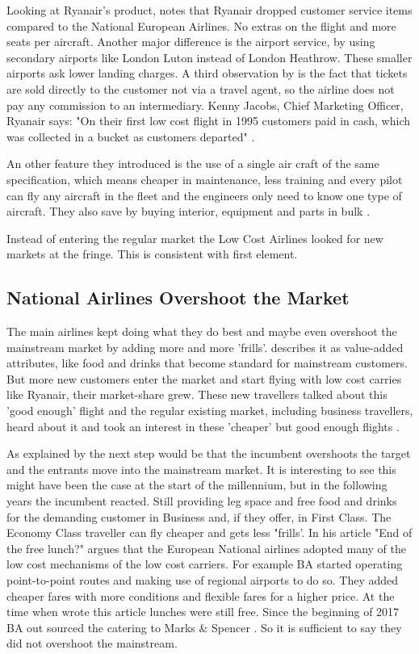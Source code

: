 \documentclass[a4paper, 11pt]{article}
\begin{document}
Looking at Ryanair's product, \cite{Barrett} notes that Ryanair dropped customer service items compared to the National European Airlines. No extras on the flight and more seats per aircraft. Another major difference is the airport service, by using secondary airports like London Luton instead of London Heathrow. These smaller airports ask lower landing charges. A third observation by \cite{Barrett} is the fact that tickets are sold directly to the customer not via a travel agent, so the airline does not pay any commission to an intermediary. Kenny Jacobs, Chief Marketing Officer, Ryanair says: "On their first low cost flight in 1995 customers paid in cash, which was collected in a bucket as customers departed" \citep{ITBberlin}.

An other feature they introduced is the use of a single air craft of the same specification, which means cheaper in maintenance, less training and every pilot can fly any aircraft in the fleet and the engineers only need to know one type of aircraft. They also save by buying interior, equipment and parts in bulk \citep{Kangis}.

Instead of entering the regular market the Low Cost Airlines looked for new markets at the fringe. This is consistent with
\cite{Christensen97} first element.

\subsection{National Airlines Overshoot the Market}
\label{national}

The main airlines kept doing what they do best and maybe even overshoot the mainstream market by adding more and more 'frills'. \cite{Droege} describes it as value-added attributes, like food and drinks that become standard for mainstream customers. But more new customers enter the market and start flying with low cost carries like Ryanair, their market-share grew. These new travellers talked about this 'good enough' flight and the regular existing market, including business travellers, heard about it and took an interest in these 'cheaper' but good enough flights \citep{TiddBessant}.

As explained by \cite{Christensen2015} the next step would be that the incumbent overshoots the target and the entrants move into
the mainstream market. It is interesting to see this might have been the case at the start of the millennium, but in the following years the incumbent reacted. Still providing leg space and free food and drinks for the demanding customer in Business and, if they offer, in
First Class. The Economy Class traveller can fly cheaper and gets less "frills'. In his article "End of the free lunch?"
\cite{Dennis} argues that the European National airlines adopted many of the low cost mechanisms of the low cost carriers. For
example BA started operating point-to-point routes and making use of regional airports to do so. They added cheaper fares with more
conditions and flexible fares for a higher price. At the time when \cite{Dennis} wrote this article lunches were still free. Since the beginning of 2017 BA out sourced the catering to Marks \& Spencer \citep{Calder}. So it is sufficient to say they did not overshoot the mainstream.
\end{document}

